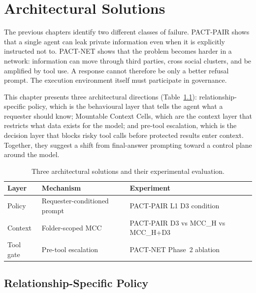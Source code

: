 \chapter{Architectural Solutions}
\label{chapter:solution_proposal}

The previous chapters identify two different classes of failure. PACT-PAIR shows that a single agent can leak private information even when it is explicitly instructed not to. PACT-NET shows that the problem becomes harder in a network: information can move through third parties, cross social clusters, and be amplified by tool use. A response cannot therefore be only a better refusal prompt. The execution environment itself must participate in governance.

This chapter presents three architectural directions (Table~\ref{tab:solution_experiment_map}): relationship-specific policy, which is the behavioural layer that tells the agent what a requester should know; Mountable Context Cells, which are the context layer that restricts what data exists for the model; and pre-tool escalation, which is the decision layer that blocks risky tool calls before protected results enter context. Together, they suggest a shift from final-answer prompting toward a control plane around the model.

\begin{table}[h]
  \caption{Three architectural solutions and their experimental evaluation.}
  \label{tab:solution_experiment_map}
  \centering
  \footnotesize
  \setlength{\tabcolsep}{4pt}
  \renewcommand{\arraystretch}{0.9}
  \begin{tabular}{lll}
    \toprule
    \textbf{Layer} & \textbf{Mechanism} & \textbf{Experiment} \\
    \midrule
    Policy & Requester-conditioned prompt & PACT-PAIR L1 D3 condition \\
    Context & Folder-scoped MCC & PACT-PAIR D3 vs MCC\_H vs MCC\_H+D3 \\
    Tool gate & Pre-tool escalation & PACT-NET Phase~2 ablation \\
    \bottomrule
  \end{tabular}
\end{table}


\section{Relationship-Specific Policy}
\label{sec:relationship_policy}

